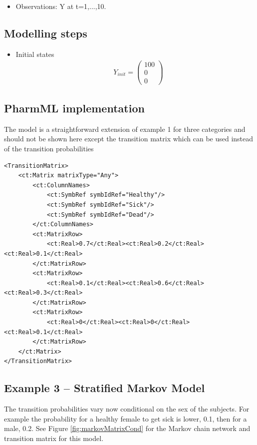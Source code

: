 \begin{itemize}
\item
Observations: Y at t=1,...,10.
\end{itemize}


\subsection*{Modelling steps}

\begin{itemize}
\item
Initial states
\begin{align}
& Y_{init} = \left( \begin{array}{c} 100 \\ 0 \\ 0 \end{array} \right) \nonumber
\end{align}
\end{itemize}



\subsection*{PharmML implementation}
The model is a straightforward extension of example 1 for three categories and should
not be shown here except the transition matrix which can be used instead of
the transition probabilities 
\lstset{language=XML}
\begin{lstlisting}
<TransitionMatrix>
    <ct:Matrix matrixType="Any">
        <ct:ColumnNames>
            <ct:SymbRef symbIdRef="Healthy"/>
            <ct:SymbRef symbIdRef="Sick"/>
            <ct:SymbRef symbIdRef="Dead"/>
        </ct:ColumnNames>
        <ct:MatrixRow>
            <ct:Real>0.7</ct:Real><ct:Real>0.2</ct:Real><ct:Real>0.1</ct:Real>
        </ct:MatrixRow>
        <ct:MatrixRow>
            <ct:Real>0.1</ct:Real><ct:Real>0.6</ct:Real><ct:Real>0.3</ct:Real>
        </ct:MatrixRow>
        <ct:MatrixRow>
            <ct:Real>0</ct:Real><ct:Real>0</ct:Real><ct:Real>0.1</ct:Real>
        </ct:MatrixRow>
    </ct:Matrix>
</TransitionMatrix>
\end{lstlisting}


\subsection{Example 3 -- Stratified Markov Model}
\label{subsec:exp3}

The transition probabilities vary now conditional on the sex of 
the subjects. For example the probability for a healthy female to 
get sick is lower, 0.1, then for a male, 0.2. See Figure \ref{fig:markovMatrixCond}
for the Markov chain network and transition matrix for this model.

